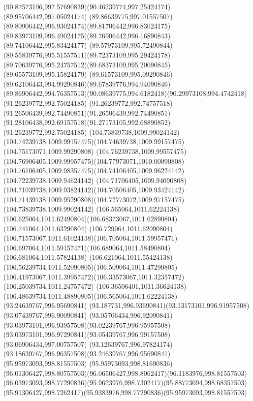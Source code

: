 {{		\curveto(90.87573106,997.57690839)(90.46239774,997.25424174)(89.95706442,997.05024174)
		\curveto(89.86639775,997.01557507)(89.80906442,996.93024174)(89.81706442,996.83024175)
		\curveto(89.83973109,996.49024175)(89.76906442,996.16890843)(89.74106442,995.83424177)
		\curveto(89.57973109,995.72490844)(89.55839776,995.51557511)(89.72373109,995.29424178)
		\curveto(89.70639776,995.24757512)(89.68373109,995.20090845)(89.65573109,995.15824179)
		\curveto(89.61573109,995.09290846)(89.62106443,994.99290846)(89.67839776,994.94090846)
		\curveto(89.86906442,994.76357513)(90.08639775,994.6182418)(90.29973108,994.4742418)
		\moveto(91.26239772,992.75024185)
		\curveto(91.26239772,992.74757518)(91.26506439,992.74490851)(91.26506439,992.74490851)
		\curveto(91.28106438,992.69157518)(91.27173105,992.68890852)(91.26239772,992.75024185)
		\moveto(104.73839738,1009.99024142)
		\curveto(104.74239738,1009.99157475)(104.74639738,1009.99157475)(104.75173071,1009.99290808)
		\curveto(104.76239738,1009.99557475)(104.76906405,1009.99957475)(104.77973071,1010.00090808)
		\curveto(104.76106405,1009.98357475)(104.74106405,1009.96224142)(104.72239738,1009.94624142)
		\curveto(104.71706405,1009.94090808)(104.71039738,1009.93824142)(104.70506405,1009.93424142)
		\curveto(104.71439738,1009.95290808)(104.72773072,1009.97157475)(104.73839738,1009.99024142)
		\moveto(106.565064,1011.62224138)
		\curveto(106.625064,1011.62490804)(106.68373067,1011.62890804)(106.741064,1011.63290804)
		\curveto(106.729064,1011.62090804)(106.71573067,1011.61024138)(106.705064,1011.59957471)
		\curveto(106.697064,1011.59157471)(106.689064,1011.58490804)(106.681064,1011.57824138)
		\curveto(106.621064,1011.55424138)(106.56239734,1011.52090805)(106.509064,1011.47290805)
		\curveto(106.41973067,1011.39957472)(106.33573067,1011.32357472)(106.25039734,1011.24757472)
		\curveto(106.36506401,1011.36624138)(106.48639734,1011.48890805)(106.565064,1011.62224138)
		\moveto(93.24639767,996.95690841)
		\curveto(93.187731,996.93690841)(93.13173101,996.91957508)(93.07439767,996.90090841)
		\curveto(93.05706434,996.92090841)(93.03973101,996.93957508)(93.02239767,996.95957508)
		\curveto(93.03973101,996.97290841)(93.05439767,996.99157508)(93.06906434,997.00757507)
		\curveto(93.12639767,996.97824174)(93.18639767,996.96357508)(93.24639767,996.95690841)
		\moveto(95.95973093,998.81557503)
		\lineto(95.95973093,998.81690836)
		\curveto(96.01306427,998.80757503)(96.06506427,998.8062417)(96.1183976,998.81557503)
		\curveto(96.03973093,998.77290836)(95.9623976,998.7302417)(95.88773094,998.68357503)
		\curveto(95.91306427,998.7262417)(95.9383976,998.77290836)(95.95973093,998.81557503)
}}
